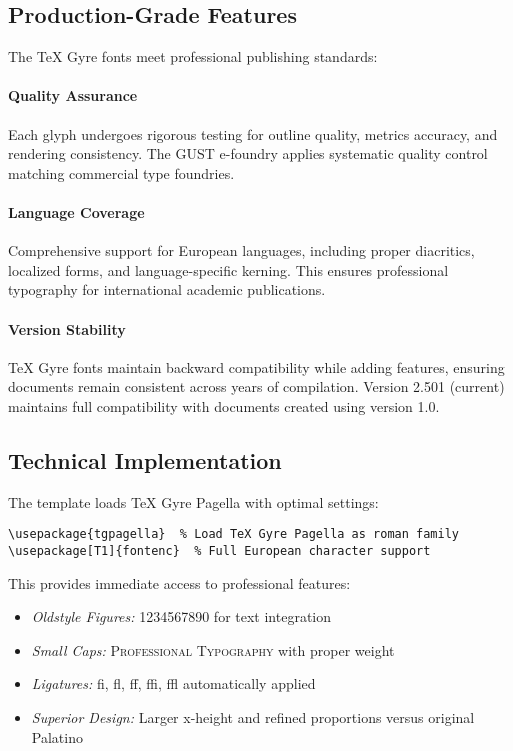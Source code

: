 \documentclass[11pt]{article}
\begin{document}
\subsection{Production-Grade Features}

The TeX Gyre fonts meet professional publishing standards:

\paragraph{Quality Assurance} Each glyph undergoes rigorous testing for outline quality, metrics accuracy, and rendering consistency. The GUST e-foundry applies systematic quality control matching commercial type foundries.

\paragraph{Language Coverage} Comprehensive support for European languages, including proper diacritics, localized forms, and language-specific kerning. This ensures professional typography for international academic publications.

\paragraph{Version Stability} TeX Gyre fonts maintain backward compatibility while adding features, ensuring documents remain consistent across years of compilation. Version 2.501 (current) maintains full compatibility with documents created using version 1.0.

\subsection{Technical Implementation}

The template loads TeX Gyre Pagella with optimal settings:

\begin{verbatim}
\usepackage{tgpagella}  % Load TeX Gyre Pagella as roman family
\usepackage[T1]{fontenc}  % Full European character support
\end{verbatim}

This provides immediate access to professional features:
\begin{itemize}
\item \emph{Oldstyle Figures:} 1234567890 for text integration
\item \emph{Small Caps:} \textsc{Professional Typography} with proper weight
\item \emph{Ligatures:} fi, fl, ff, ffi, ffl automatically applied
\item \emph{Superior Design:} Larger x-height and refined proportions versus original Palatino
\end{itemize}
\end{document}
